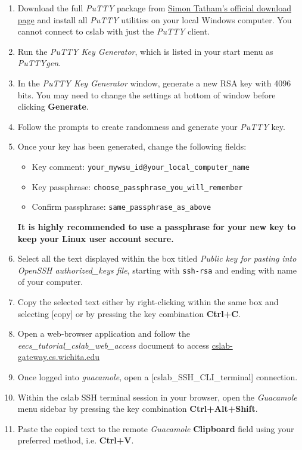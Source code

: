 \documentclass[12pt]{article}
\begin{document}
\begin{flushleft}
\begin{enumerate}
  \item Download the full \textit{PuTTY} package from \href{https://www.chiark.greenend.org.uk/~sgtatham/putty/latest.html}{Simon Tatham's official download page} and install all \textit{PuTTY} utilities on your local Windows computer. You cannot connect to cslab with just the \textit{PuTTY} client.
  \item Run the \textit{PuTTY Key Generator}, which is listed in your start menu as \textit{PuTTYgen}.
  \item In the \textit{PuTTY Key Generator} window, generate a new RSA key with 4096 bits. You may need to change the settings at bottom of window before clicking \textbf{Generate}.
  \item Follow the prompts to create randomness and generate your \textit{PuTTY} key.
  \item Once your key has been generated, change the following fields:
    \begin{itemize}
    \item Key comment: \texttt{your\_mywsu\_id@your\_local\_computer\_name}
    \item Key passphrase: \texttt{choose\_passphrase\_you\_will\_remember}
    \item Confirm passphrase: \texttt{same\_passphrase\_as\_above}
    \end{itemize}
    \textbf{It is highly recommended to use a passphrase for your new key to keep your Linux user account secure.}
  \item Select all the text displayed within the box titled \textit{Public key for pasting into OpenSSH authorized\_keys file}, starting with \texttt{ssh-rsa} and ending with name of your computer.
  \item Copy the selected text either by right-clicking within the same box and selecting [copy] or by pressing the key combination \textbf{Ctrl+C}.
  \item Open a web-browser application and follow the \textit{eecs\_tutorial\_cslab\_web\_access} document to access \href{https://cslab-gateway.cs.wichita.edu/}{cslab-gateway.cs.wichita.edu}
  \item Once logged into \textit{guacamole}, open a [cslab\_SSH\_CLI\_terminal] connection.
  \item Within the cslab SSH terminal session in your browser, open the \textit{Guacamole} menu sidebar by pressing the key combination \textbf{Ctrl+Alt+Shift}.
  \item Paste the copied text to the remote \textit{Guacamole} \textbf{Clipboard} field using your preferred method, i.e. \textbf{Ctrl+V}.

\end{enumerate}
\end{flushleft}
\end{document}

